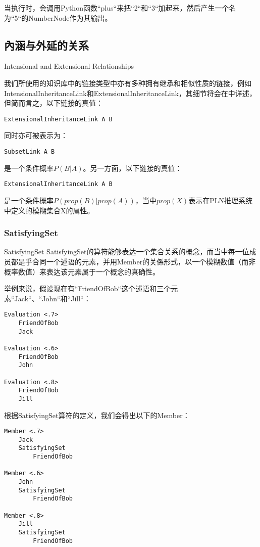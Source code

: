 \noindent 当执行时，会调用Python函数“plus“来把“2“和“3“加起来，然后产生一个名为“5“的NumberNode作为其输出。

\subsection{內涵与外延的关系}{Intensional and Extensional Relationships}


我们所使用的知识库中的链接类型中亦有多种拥有继承和相似性质的链接，例如IntensionalInheritanceLink和ExtensionalInheritanceLink，其细节将会在\cite{PLN}中详述，但简而言之，以下链接的真值：

\begin{verbatim}
ExtensionalInheritanceLink A B
\end{verbatim}

\noindent 同时亦可被表示为：

\begin{verbatim}
SubsetLink A B
\end{verbatim}

\noindent 是一个条件概率$P(B|A)$。另一方面，以下链接的真值：

\begin{verbatim}
ExtensionalInheritanceLink A B
\end{verbatim}

\noindent 是一个条件概率$P(prop(B)|prop(A))$，当中$prop(X)$表示在PLN推理系统中定义的模糊集合X的属性。

\subsubsection{SatisfyingSet}{SatisfyingSet}
SatisfyingSet的算符能够表达一个集合关系的概念，而当中每一位成员都是乎合同一个述语的元素，并用Member的关係形式，以一个模糊数值（而非概率数值）来表达该元素属于一个概念的真确性。

举例来说，假设现在有“FriendOfBob“这个述语和三个元素“Jack“、“John“和“Jill“：

\begin{verbatim}
Evaluation <.7>
	FriendOfBob
	Jack

Evaluation <.6>
	FriendOfBob
	John

Evaluation <.8>
	FriendOfBob
	Jill
\end{verbatim}

根据SatisfyingSet算符的定义，我们会得出以下的Member：

\begin{verbatim}
Member <.7>
	Jack
	SatisfyingSet
		FriendOfBob

Member <.6>
	John
	SatisfyingSet
		FriendOfBob

Member <.8>
	Jill
	SatisfyingSet
		FriendOfBob
\end{verbatim}


